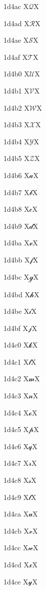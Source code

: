 \documentclass[11pt]{article}
\begin{document}
1d4ac X{\ensuremath{\mathscr{Q}}}X

1d4ad X{\ensuremath{\mathscr{R}}}X

1d4ae X{\ensuremath{\mathscr{S}}}X

1d4af X{\ensuremath{\mathscr{T}}}X

1d4b0 X{\ensuremath{\mathscr{U}}}X

1d4b1 X{\ensuremath{\mathscr{V}}}X

1d4b2 X{\ensuremath{\mathscr{W}}}X

1d4b3 X{\ensuremath{\mathscr{X}}}X

1d4b4 X{\ensuremath{\mathscr{Y}}}X

1d4b5 X{\ensuremath{\mathscr{Z}}}X

1d4b6 X{\ensuremath{\mathscr{a}}}X

1d4b7 X{\ensuremath{\mathscr{b}}}X

1d4b8 X{\ensuremath{\mathscr{c}}}X

1d4b9 X{\ensuremath{\mathscr{d}}}X

1d4ba X{\ensuremath{\mathscr{e}}}X

1d4bb X{\ensuremath{\mathscr{f}}}X

1d4bc X{\ensuremath{\mathscr{g}}}X

1d4bd X{\ensuremath{\mathscr{h}}}X

1d4be X{\ensuremath{\mathscr{i}}}X

1d4bf X{\ensuremath{\mathscr{j}}}X

1d4c0 X{\ensuremath{\mathscr{k}}}X

1d4c1 X{\ensuremath{\mathscr{l}}}X

1d4c2 X{\ensuremath{\mathscr{m}}}X

1d4c3 X{\ensuremath{\mathscr{n}}}X

1d4c4 X{\ensuremath{\mathscr{o}}}X

1d4c5 X{\ensuremath{\mathscr{p}}}X

1d4c6 X{\ensuremath{\mathscr{q}}}X

1d4c7 X{\ensuremath{\mathscr{r}}}X

1d4c8 X{\ensuremath{\mathscr{s}}}X

1d4c9 X{\ensuremath{\mathscr{t}}}X

1d4ca X{\ensuremath{\mathscr{u}}}X

1d4cb X{\ensuremath{\mathscr{v}}}X

1d4cc X{\ensuremath{\mathscr{w}}}X

1d4cd X{\ensuremath{\mathscr{x}}}X

1d4ce X{\ensuremath{\mathscr{y}}}X
\end{document}
